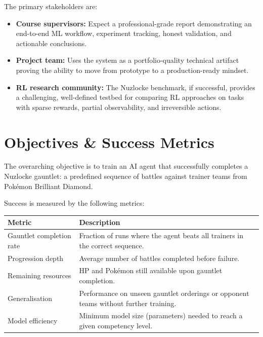 The primary stakeholders are:

\begin{itemize}
  \item \textbf{Course supervisors:} Expect a professional-grade report
        demonstrating an end-to-end ML workflow, experiment tracking, honest
        validation, and actionable conclusions.
  \item \textbf{Project team:} Uses the system as a portfolio-quality technical
        artifact proving the ability to move from prototype to a
        production-ready mindset.
  \item \textbf{RL research community:} The Nuzlocke benchmark, if
        successful, provides a challenging, well-defined testbed for
        comparing RL approaches on tasks with sparse rewards, partial
        observability, and irreversible actions.
\end{itemize}

\section{Objectives \& Success Metrics}

The overarching objective is to train an AI agent that successfully completes a
Nuzlocke gauntlet: a predefined sequence of battles against trainer teams from
Pok\'{e}mon Brilliant Diamond.

Success is measured by the following metrics:

\begin{center}
\small
\begin{tabularx}{\textwidth}{l X}
  \toprule
  \textbf{Metric} & \textbf{Description} \\
  \midrule
  Gauntlet completion rate  & Fraction of runs where the agent beats all
                             trainers in the correct sequence. \\
  Progression depth         & Average number of battles completed before
                             failure. \\
  Remaining resources       & HP and Pok\'{e}mon still available upon
                             gauntlet completion. \\
  Generalisation            & Performance on unseen gauntlet orderings or
                             opponent teams without further training. \\
  Model efficiency          & Minimum model size (parameters) needed to reach
                             a given competency level. \\
  \bottomrule
\end{tabularx}
\end{center}

